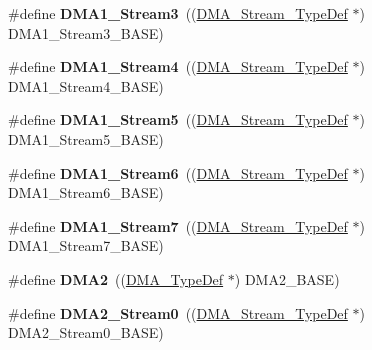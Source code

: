 \begin{DoxyCompactItemize}
\item 
\mbox{\label{group___peripheral__declaration_ga96ac1af7a92469fe86a9fbdec091f25d}} 
\#define {\bfseries D\+M\+A1\+\_\+\+Stream3}~((\hyperlink{struct_d_m_a___stream___type_def}{D\+M\+A\+\_\+\+Stream\+\_\+\+Type\+Def} $\ast$) D\+M\+A1\+\_\+\+Stream3\+\_\+\+B\+A\+SE)
\item 
\mbox{\label{group___peripheral__declaration_ga87df45f4b82e0b3a8c1b17f1a77aecdb}} 
\#define {\bfseries D\+M\+A1\+\_\+\+Stream4}~((\hyperlink{struct_d_m_a___stream___type_def}{D\+M\+A\+\_\+\+Stream\+\_\+\+Type\+Def} $\ast$) D\+M\+A1\+\_\+\+Stream4\+\_\+\+B\+A\+SE)
\item 
\mbox{\label{group___peripheral__declaration_gac3abc20f80e25c19b02104ad34eae652}} 
\#define {\bfseries D\+M\+A1\+\_\+\+Stream5}~((\hyperlink{struct_d_m_a___stream___type_def}{D\+M\+A\+\_\+\+Stream\+\_\+\+Type\+Def} $\ast$) D\+M\+A1\+\_\+\+Stream5\+\_\+\+B\+A\+SE)
\item 
\mbox{\label{group___peripheral__declaration_gac95127480470900755953f1cfe68567d}} 
\#define {\bfseries D\+M\+A1\+\_\+\+Stream6}~((\hyperlink{struct_d_m_a___stream___type_def}{D\+M\+A\+\_\+\+Stream\+\_\+\+Type\+Def} $\ast$) D\+M\+A1\+\_\+\+Stream6\+\_\+\+B\+A\+SE)
\item 
\mbox{\label{group___peripheral__declaration_ga8ecdeaf43d0f4207dab1fdb4d7bf8d26}} 
\#define {\bfseries D\+M\+A1\+\_\+\+Stream7}~((\hyperlink{struct_d_m_a___stream___type_def}{D\+M\+A\+\_\+\+Stream\+\_\+\+Type\+Def} $\ast$) D\+M\+A1\+\_\+\+Stream7\+\_\+\+B\+A\+SE)
\item 
\mbox{\label{group___peripheral__declaration_ga506520140eec1708bc7570c49bdf972d}} 
\#define {\bfseries D\+M\+A2}~((\hyperlink{struct_d_m_a___type_def}{D\+M\+A\+\_\+\+Type\+Def} $\ast$) D\+M\+A2\+\_\+\+B\+A\+SE)
\item 
\mbox{\label{group___peripheral__declaration_ga3a2efe5fd7a7a79be3b08a1670bbd016}} 
\#define {\bfseries D\+M\+A2\+\_\+\+Stream0}~((\hyperlink{struct_d_m_a___stream___type_def}{D\+M\+A\+\_\+\+Stream\+\_\+\+Type\+Def} $\ast$) D\+M\+A2\+\_\+\+Stream0\+\_\+\+B\+A\+SE)

\end{DoxyCompactItemize}
